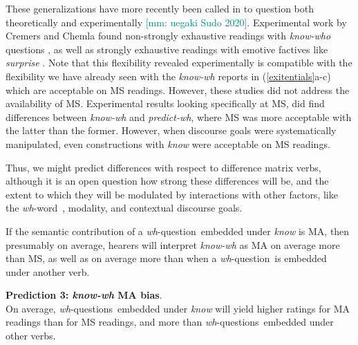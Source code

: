 \documentclass[12pt,letterpaper,table,svgnames,dvipsnames]{article}
\newcommand{\jd}[1]{\textcolor{Purple}{[jd: #1]}}
\newcommand{\mm}[1]{\textcolor{teal}{[mm: #1]}}
\newcommand{\whq}{\emph{wh}-question~}
\newcommand{\whqs}{\emph{wh}-questions~}
\newcommand{\whw}{\emph{wh}-word~}
\begin{document}

These generalizations have more recently been called in to question both theoretically and experimentally \cite{cremchem2016,cremchem2017,klineroth2011,theiler2014} \mm{uegaki Sudo 2020}. Experimental work by Cremers and Chemla found non-strongly exhaustive readings with \emph{know-who} questions \cite{cremchem2016}, as well as strongly exhaustive readings with emotive factives like \emph{surprise} \cite{cremchem2017}. Note that this flexibility revealed experimentally is compatible with the flexibility we have already seen with the \emph{know-wh} reports in (\ref{exitentials}a-c) which are acceptable on MS readings. However, these studies did not address the availability of MS. Experimental results looking specifically at MS,  did find differences between \emph{know-wh} and \emph{predict-wh}, where MS was more acceptable with the latter than the former. However, when discourse goals were systematically manipulated, even constructions with \emph{know} were acceptable on MS readings. 

Thus, we might predict differences with respect to difference matrix verbs, although it is an open question how strong these differences will be, and the extent to which they will be modulated by interactions with other factors, like the \whw, modality, and contextual discourse goals.

If the semantic contribution of a \whq embedded under \emph{know} is MA, then presumably on average, hearers will interpret \emph{know-wh} as MA on average more than MS, as well as on average more than when a \whq is embedded under another verb.

\begin{tcolorbox}[colback=white]
\noindent \textbf{Prediction 3: \emph{know-wh} MA bias}.\\
On average, \whqs embedded under \emph{know} will yield higher ratings for MA readings than for MS readings, and more than \whqs embedded under other verbs. 
\end{tcolorbox}
\end{document}
